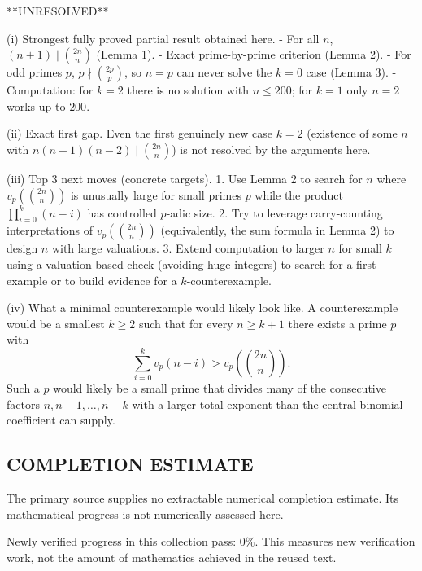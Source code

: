 **UNRESOLVED**

(i) Strongest fully proved partial result obtained here.
- For all $n$, $(n+1)\mid\binom{2n}{n}$ (Lemma 1).
- Exact prime-by-prime criterion (Lemma 2).
- For odd primes $p$, $p\nmid\binom{2p}{p}$, so $n=p$ can never solve the $k=0$ case (Lemma 3).
- Computation: for $k=2$ there is no solution with $n\le 200$; for $k=1$ only $n=2$ works up to $200$.

(ii) Exact first gap.
Even the first genuinely new case $k=2$ (existence of some $n$ with $n(n-1)(n-2)\mid\binom{2n}{n}$) is not resolved by the arguments here.

(iii) Top 3 next moves (concrete targets).
1. Use Lemma 2 to search for $n$ where $v_p\!\left(\binom{2n}{n}\right)$ is unusually large for small primes $p$ while the product $\prod_{i=0}^k(n-i)$ has controlled $p$-adic size.
2. Try to leverage carry-counting interpretations of $v_p\!\left(\binom{2n}{n}\right)$ (equivalently, the sum formula in Lemma 2) to design $n$ with large valuations.
3. Extend computation to larger $n$ for small $k$ using a valuation-based check (avoiding huge integers) to search for a first example or to build evidence for a $k$-counterexample.

(iv) What a minimal counterexample would likely look like.
A counterexample would be a smallest $k\ge 2$ such that for every $n\ge k+1$ there exists a prime $p$ with
\[
\sum_{i=0}^{k} v_p(n-i) > v_p\!\left(\binom{2n}{n}\right).
\]
Such a $p$ would likely be a small prime that divides many of the consecutive factors $n,n-1,\dots,n-k$ with a larger total exponent than the central binomial coefficient can supply.




\subsection*{COMPLETION ESTIMATE}
The primary source supplies no extractable numerical completion estimate. Its mathematical progress is not numerically assessed here.

Newly verified progress in this collection pass: $0\%$. This measures new verification work, not the amount of mathematics achieved in the reused text.

